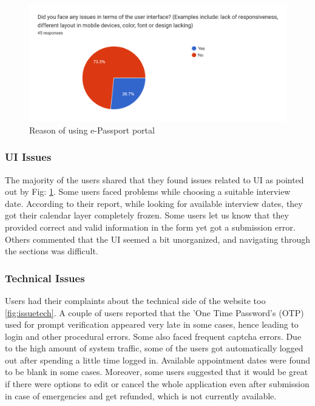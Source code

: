 \begin{figure}[ht]
\centering
\centerline{\includegraphics[width=\linewidth]{Figures/issueui.png}}
\vspace{-10pt}\caption{Reason of using e-Passport portal}
\label{fig:issueui}
\end{figure}

\subsubsection{UI Issues} 

The majority of the users shared that they found issues related to UI as pointed out by Fig: \ref{fig:issueui}. Some users faced problems while choosing a suitable interview date. According to their report, while looking for available interview dates, they got their calendar layer completely frozen. Some users let us know that they provided correct and valid information in the form yet got a submission error. Others commented that the UI seemed a bit unorganized, and navigating through the sections was difficult.
\newline

\subsubsection{Technical Issues}

Users had their complaints about the technical side of the website too \ref{fig:issuetech}. A couple of users reported that the 'One Time Password's (OTP) used for prompt verification appeared very late in some cases, hence leading to login and other procedural errors. Some also faced frequent captcha errors. Due to the high amount of system traffic, some of the users got automatically logged out after spending a little time logged in. Available appointment dates were found to be blank in some cases. Moreover, some users suggested that it would be great if there were options to edit or cancel the whole application even after submission in case of emergencies and get refunded, which is not currently available.

